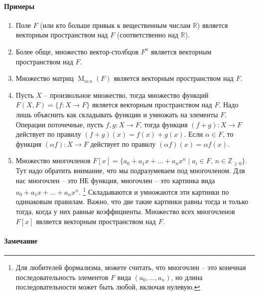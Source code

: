 \paragraph{Примеры}

\begin{enumerate}
\item Поле $F$ (или кто больше привык к вещественным числам $\mathbb R$) является векторным пространством над $F$ (соответственно над $\mathbb R$).

\item Более обще, множество вектор-столбцов $F^n$ является векторным пространством над $F$.

\item Множество матриц $\operatorname{M}_{m\,n}(F)$ является векторным пространством над $F$.

\item Пусть $X$ -- произвольное множество, тогда множество функций $F(X, F) = \{f\colon X\to F\}$ является векторным пространством над $F$.
Надо лишь объяснить как складывать функции и умножать на элементы $F$.
Операции поточечные, пусть $f,g\colon X\to F$, тогда функция $(f+g)\colon X\to F$ действует по правилу $(f+g)(x) = f(x) + g(x)$.
Если $\alpha \in F$, то функция $(\alpha f)\colon X\to F$ действует по правилу $(\alpha f)(x) = \alpha f(x)$.

\item Множество многочленов $F[x] = \{a_0+a_1x + \ldots + a_n x^n\mid a_i \in F,\,n\in \mathbb Z_{\geqslant 0}\}$.
Тут надо обратить внимание, что мы подразумеваем под многочленом.
Для нас многочлен -- это НЕ функция, многочлен -- это картинка вида $a_0 + a_1 x + \ldots + a_n x^n$.%
\footnote{Для любителей формализма, можете считать, что многочлен -- это конечная последовательность элементов $F$ вида $(a_0,\ldots,a_n)$, но длина последовательности может быть любой, включая нулевую.}
Складываются и умножаются эти картинки по одинаковым правилам.
Важно, что две такие картинки равны тогда и только тогда, когда у них равные коэффициенты.
Множество всех многочленов $F[x]$ является векторным пространством над $F$.
\end{enumerate}

\paragraph{Замечание}


